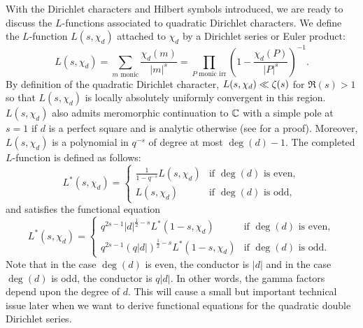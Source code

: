 \documentclass[12pt,reqno,oneside]{amsart}
\begin{document}
    With the Dirichlet characters and Hilbert symbols introduced, we are ready to discuss the $L$-functions associated to quadratic Dirichlet characters. We define the $L$-function $L(s,\chi_{d})$ attached to $\chi_{d}$ by a Dirichlet series or Euler product:
    \[
        L(s,\chi_{d}) = \sum_{\text{$m$ monic}}\frac{\chi_{d}(m)}{|m|^{s}} = \prod_{\text{$P$ monic irr}}\left(1-\frac{\chi_{d}(P)}{|P|^{s}}\right)^{-1}.
    \]
    By definition of the quadratic Dirichlet character, $L(s,\chi_{d}) \ll \zeta(s)$ for $\Re(s) > 1$ so that $L(s,\chi_{d})$ is locally absolutely uniformly convergent in this region. $L(s,\chi_{d})$ also admits meromorphic continuation to $\mathbb{C}$ with a simple pole at $s = 1$ if $d$ is a perfect square and is analytic otherwise (see \cite{rosen2002number} for a proof). Moreover, $L(s,\chi_{d})$ is a polynomial in $q^{-s}$ of degree at most $\deg(d)-1$. The completed $L$-function is defined as follows:
    \[
        L^{\ast}(s,\chi_{d}) = \begin{cases} \frac{1}{1-q^{-s}}L(s,\chi_{d}) & \text{if $\deg(d)$ is even}, \\ L(s,\chi_{d}) & \text{if $\deg(d)$ is odd}, \end{cases}
    \]
    and satisfies the functional equation
    \[
        L^{\ast}(s,\chi_{d}) = \begin{cases} q^{2s-1}|d|^{\frac{1}{2}-s}L^{\ast}(1-s,\chi_{d}) & \text{if $\deg(d)$ is even}, \\ q^{2s-1}(q|d|)^{\frac{1}{2}-s}L^{\ast}(1-s,\chi_{d}) & \text{if $\deg(d)$ is odd}. \end{cases}
    \]
    Note that in the case $\deg(d)$ is even, the conductor is $|d|$ and in the case $\deg(d)$ is odd, the conductor is $q|d|$. In other words, the gamma factors depend upon the degree of $d$. This will cause a small but important technical issue later when we want to derive functional equations for the quadratic double Dirichlet series.
\end{document}
